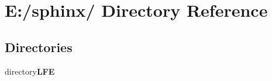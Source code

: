 \section{E:/sphinx/ Directory Reference}
\label{dir_000001}
\subsection*{Directories}
\begin{CompactItemize}
\item 
directory{\bf LFE}
\end{CompactItemize}

